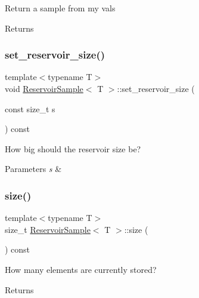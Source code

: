 Return a sample from my vals \begin{DoxyReturn}{Returns}

\end{DoxyReturn}
\mbox{\label{class_reservoir_sample_ae67a44361cb145cc2f355290ff4babad}} 
\subsubsection{\texorpdfstring{set\+\_\+reservoir\+\_\+size()}{set\_reservoir\_size()}}
{\footnotesize\ttfamily template$<$typename T$>$ \\
void \hyperlink{class_reservoir_sample}{Reservoir\+Sample}$<$ T $>$\+::set\+\_\+reservoir\+\_\+size (\begin{DoxyParamCaption}\item[{const size\+\_\+t}]{s }\end{DoxyParamCaption}) const\hspace{0.3cm}{\ttfamily [inline]}}

How big should the reservoir size be? 
\begin{DoxyParams}{Parameters}
{\em s} & \\
\hline
\end{DoxyParams}
\mbox{\label{class_reservoir_sample_a53a41ec89cedfec21c7924aa98347659}} 
\subsubsection{\texorpdfstring{size()}{size()}}
{\footnotesize\ttfamily template$<$typename T$>$ \\
size\+\_\+t \hyperlink{class_reservoir_sample}{Reservoir\+Sample}$<$ T $>$\+::size (\begin{DoxyParamCaption}{ }\end{DoxyParamCaption}) const\hspace{0.3cm}{\ttfamily [inline]}}

How many elements are currently stored? \begin{DoxyReturn}{Returns}

\end{DoxyReturn}
\mbox{\label{class_reservoir_sample_a0f0abf510882715b487f2254b6af25b1}} 
